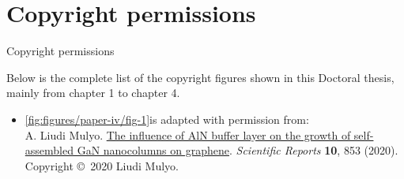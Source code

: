 
\chapter[Copyright permissions]{Copyright permissions}

%
{Copyright permissions}

\regularsection
\headerregularsection

Below is the complete list of the copyright figures shown in this Doctoral thesis, mainly from chapter 1 to chapter 4.

\begin{itemize} [wide=0em, leftmargin=*, label=] %

    
    

    \item \ref{fig:figures/paper-iv/fig-1}is adapted with permission from: \\ A. Liudi Mulyo. \href{https://www.nature.com/articles/s41598-019-55424-z}{The influence of AlN buffer layer on the growth of self-assembled GaN nanocolumns on graphene}. \textit{Scientific Reports} \textbf{10}, 853 (2020). \\ Copyright \copyright \ 2020 Liudi Mulyo.
    

\end{itemize}

